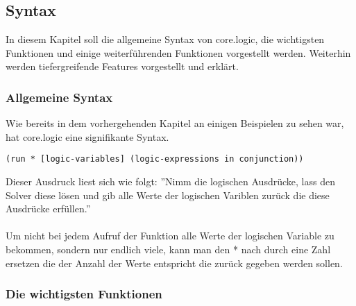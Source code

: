 \subsection{Syntax}

In diesem Kapitel soll die allgemeine Syntax von core.logic, die wichtigsten Funktionen und einige weiterführenden Funktionen vorgestellt werden. Weiterhin werden tiefergreifende Features vorgestellt und erklärt.

\subsubsection{Allgemeine Syntax}

Wie bereits in dem vorhergehenden Kapitel an einigen Beispielen zu sehen war, hat core.logic eine signifikante Syntax.
\begin{lstlisting}
(run * [logic-variables] (logic-expressions in conjunction))
\end{lstlisting}
Dieser Ausdruck liest sich wie folgt: ''Nimm die logischen Ausdrücke, lass den Solver diese lösen und gib alle Werte der logischen Variblen zurück die diese Ausdrücke erfüllen.''\\
\\
Um nicht bei jedem Aufruf der  Funktion alle Werte der logischen Variable zu bekommen, sondern nur endlich viele, kann man den * nach  durch eine Zahl ersetzen die der Anzahl der Werte entspricht die zurück gegeben werden sollen.

\subsubsection{Die wichtigsten Funktionen}\label{sec:functions}

